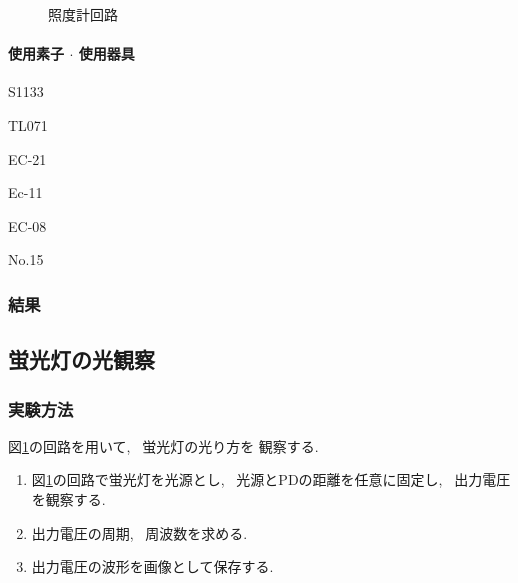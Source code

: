 \documentclass[titlepage]{jsarticle}
\begin{document}
            \begin{figure}[ht]
                \centering
                \caption{照度計回路}
                \label{fig:照度計}
            \end{figure}

            \paragraph{使用素子 $\cdot$ 使用器具}
                \begin{description}
                    \setlength{\leftskip}{1.5em}
                    \item[PD] S1133
                    \item[オペアンプ] TL071
                    \item[デジタルマルチメータ] EC-21
                    \item[直流電源] Ec-11
                    \item[ブレッドボード] EC-08
                    \item[オシロスコープ] No.15  
                \end{description}

        \subsubsection{結果}
            

    \subsection{蛍光灯の光観察}
        \subsubsection{実験方法}
            図\ref{fig:照度計}の回路を用いて, ~蛍光灯の光り方を
            観察する.

            \begin{enumerate}
                \item 図\ref{fig:照度計}の回路で蛍光灯を光源とし,
                    ~光源とPDの距離を任意に固定し, ~出力電圧を観察する.
                \item 出力電圧の周期, ~周波数を求める.
                \item 出力電圧の波形を画像として保存する.
            \end{enumerate}
\end{document}
